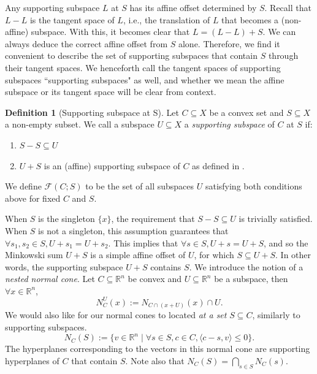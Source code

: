 \documentclass{article}
\theoremstyle{plain}
\theoremstyle{definition}
\newtheorem{definition}{Definition}[section]
\theoremstyle{remark}
\begin{document}
Any supporting subspace $L$ at $S$ has its affine offset determined by
$S$. Recall that $L-L$ is the tangent space of $L$, i.e., the translation
of $L$ that becomes a (non-affine) subspace. With this, it becomes
clear that $L = (L-L) + S$. We can always deduce the correct affine
offset from $S$ alone. Therefore, we find it convenient to describe the
set of supporting subspaces that contain $S$ through their
tangent spaces. We henceforth call the tangent spaces of supporting subspaces 
``supporting subspaces" as well, and whether we mean 
the affine subspace or its tangent space will be clear from context.
\begin{definition}[Supporting subspace at S]
\label{loc:supporting_subspace_at_s.statement}
Let $C \subseteq X$ be a convex set and $S \subseteq X$ a non-empty subset. 
We call a subspace $U \subseteq X$ a \emph{supporting subspace} of $C$ at $S$ if:
\begin{enumerate}
\item $S - S \subseteq U$ 
\item $U + S$ is an (affine) supporting subspace of $C$ as defined in .
\end{enumerate}

We define $\mathcal{F}(C; S)$ to be the set of all subspaces $U$
satisfying both conditions above for fixed $C$ and $S$.
\end{definition}
When $S$ is the singleton $\{x\}$, the requirement that $S-S \subseteq U$ is
trivially satisfied. When $S$ is not a singleton, this assumption guarantees
that $\forall s_1, s_2 \in S, U + s_1 =  U + s_2$. This implies that
$\forall s \in S, U+s = U + S$, and so the Minkowski sum $U + S$ is
a simple affine offset of $U$, for which $S \subseteq U+S$. In other
words, the supporting subspace $U + S$ contains $S$.
We introduce the notion of a \emph{nested normal cone}. Let $C \subseteq \mathbb{R}^n$ be convex and $U \subseteq \mathbb{R}^n$ be a subspace, then $\forall x \in \mathbb{R}^n$,
\begin{equation*}
N_C^U(x) := N_{C \cap (x + U)}(x) \cap U.
\end{equation*}
We would also like for our normal cones to located \emph{at a set} $S \subseteq C$, similarly to supporting subspaces.
\begin{equation*}
N_C(S) := \{v \in \mathbb{R}^n \mid \forall s \in S, c \in C,  \langle c-s, v\rangle \le 0\}.
\end{equation*}
The hyperplanes corresponding to the vectors in this normal cone are
supporting hyperplanes of $C$ that contain $S$. Note also that $N_C(S) = \bigcap_{s \in S} N_C(s).$
\end{document}
